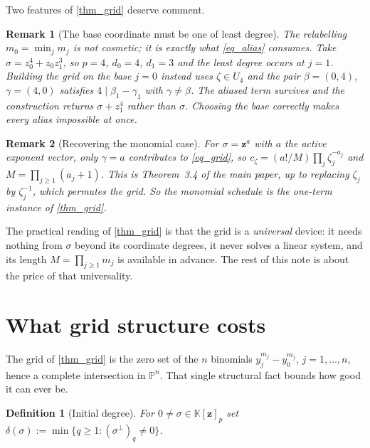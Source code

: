\documentclass[final]{siamltex}
\newtheorem{definition}[definition]{Definition}
\newtheorem{remark}[remark]{Remark}
\newcommand{\K}{\mathbb{K}}
\newcommand{\bz}{\bm{z}}
\begin{document}
Two features of \cref{thm_grid} deserve comment.

\begin{remark}[The base coordinate must be one of least degree]\label{rmk_base}
  The relabelling $m_{0}=\min_{j}m_{j}$ is not cosmetic; it is exactly what
  \eqref{eq_alias} consumes.  Take $\sigma = z_{0}^{4} + z_{0}z_{1}^{3}$, so
  $p=4$, $d_{0}=4$, $d_{1}=3$ and the least degree occurs at $j=1$.  Building
  the grid on the base $j=0$ instead uses $\zeta \in U_{4}$ and the pair
  $\beta=(0,4)$, $\gamma=(4,0)$ satisfies $4 \mid \beta_{1}-\gamma_{1}$ with
  $\gamma \neq \beta$.  The aliased term survives and the construction returns
  $\sigma + z_{1}^{4}$ rather than $\sigma$.  Choosing the base correctly makes
  every alias impossible at once.
\end{remark}

\begin{remark}[Recovering the monomial case]\label{rmk_monomial}
  For $\sigma = \bz^{a}$ with $a$ the active exponent vector, only
  $\gamma = a$ contributes to \eqref{eq_grid}, so
  $c_{\zeta} = (a!/M)\prod_{j}\zeta_{j}^{-a_{j}}$ and $M = \prod_{j\ge1}(a_{j}+1)$.
  This is Theorem~3.4 of the main paper, up to replacing $\zeta_{j}$ by
  $\zeta_{j}^{-1}$, which permutes the grid.  So the monomial schedule is the
  one-term instance of \cref{thm_grid}.
\end{remark}

The practical reading of \cref{thm_grid} is that the grid is a
\emph{universal} device: it needs nothing from $\sigma$ beyond its coordinate
degrees, it never solves a linear system, and its length
$M = \prod_{j\ge1}m_{j}$ is available in advance.  The rest of this note is
about the price of that universality.

\section{What grid structure costs}\label{sec_cost}

The grid of \cref{thm_grid} is the zero set of the $n$ binomials
$y_{j}^{m_{j}} - y_{0}^{m_{j}}$, $j = 1,\ldots,n$, hence a complete intersection
in $\mathbb{P}^{n}$.  That single structural fact bounds how good it can ever be.

\begin{definition}[Initial degree]\label{def_initial}
  For $0 \neq \sigma \in \K[\bz]_{p}$ set
  $\delta(\sigma) := \min\{q \ge 1 : (\sigma^{\perp})_{q} \neq 0\}$.
\end{definition}
\end{document}
